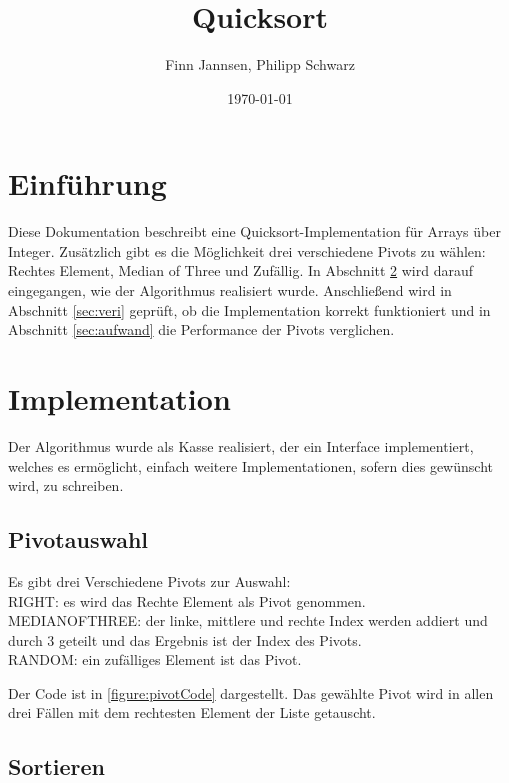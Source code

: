 \documentclass[11pt]{scrartcl}
\title{Quicksort}
\author{Finn Jannsen, Philipp Schwarz}
\date{\today{}}
\begin{document}
\maketitle

\tableofcontents

\section{Einführung}
	\label{sec:einfuehrung}
	
	Diese Dokumentation beschreibt eine Quicksort-Implementation für Arrays über Integer.
	Zusätzlich gibt es die Möglichkeit drei verschiedene Pivots zu wählen: Rechtes Element, Median of Three und Zufällig.
	In Abschnitt \ref{sec:implementation} wird darauf eingegangen, wie der Algorithmus realisiert wurde.
	Anschließend wird in Abschnitt \ref{sec:veri} geprüft, ob die Implementation korrekt funktioniert und in Abschnitt \ref{sec:aufwand} die Performance der Pivots verglichen.

\section{Implementation}
	\label{sec:implementation}
	
	Der Algorithmus wurde als Kasse realisiert, der ein Interface implementiert, welches es ermöglicht, einfach weitere Implementationen, sofern dies gewünscht wird, zu schreiben.

	\subsection{Pivotauswahl}
		\label{sec:pivAus}
		
		Es gibt drei Verschiedene Pivots zur Auswahl:\\
		RIGHT: es wird das Rechte Element als Pivot genommen.\\
		MEDIANOFTHREE: der linke, mittlere und rechte Index werden addiert und durch 3 geteilt und das Ergebnis ist der Index des Pivots.\\
		RANDOM: ein zufälliges Element ist das Pivot.

		Der Code ist in \ref{figure:pivotCode} dargestellt. Das gewählte Pivot wird in allen drei Fällen mit dem rechtesten Element der Liste getauscht.
	
	\subsection{Sortieren}
		\label{sec:sortAlgo}
		
\end{document}
